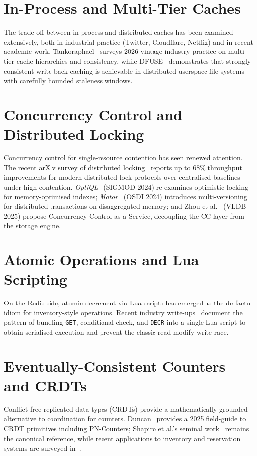 \documentclass[12pt,a4paper,oneside]{report}
\begin{document}
\section[Multi-Tier Caches]{In-Process and Multi-Tier Caches}
The trade-off between in-process and distributed caches has been examined extensively, both in industrial practice (Twitter, Cloudflare, Netflix) and in recent academic work. Tankoraphael~\cite{tankoraphael2026architecture} surveys 2026-vintage industry practice on multi-tier cache hierarchies and consistency, while DFUSE~\cite{wong2024dfuse} demonstrates that strongly-consistent write-back caching is achievable in distributed userspace file systems with carefully bounded staleness windows.

\section[Concurrency Control]{Concurrency Control and Distributed Locking}
Concurrency control for single-resource contention has seen renewed attention. The recent arXiv survey of distributed locking~\cite{anonymous2025distlock} reports up to 68\% throughput improvements for modern distributed lock protocols over centralised baselines under high contention. \emph{OptiQL}~\cite{wang2024optiql} (SIGMOD 2024) re-examines optimistic locking for memory-optimised indexes; \emph{Motor}~\cite{wei2024motor} (OSDI 2024) introduces multi-versioning for distributed transactions on disaggregated memory; and Zhou et al.~\cite{zhou2025ccaas} (VLDB 2025) propose Concurrency-Control-as-a-Service, decoupling the CC layer from the storage engine.

\section[Atomic Operations]{Atomic Operations and Lua Scripting}
On the Redis side, atomic decrement via Lua scripts has emerged as the de facto idiom for inventory-style operations. Recent industry write-ups~\cite{oneuptime2026lua, oneuptime2026inventory, dev2025redislua} document the pattern of bundling \texttt{GET}, conditional check, and \texttt{DECR} into a single Lua script to obtain serialised execution and prevent the classic read-modify-write race.

\section[CRDT Counters]{Eventually-Consistent Counters and CRDTs}
Conflict-free replicated data types (CRDTs) provide a mathematically-grounded alternative to coordination for counters. Duncan~\cite{duncan2025crdt} provides a 2025 field-guide to CRDT primitives including PN-Counters; Shapiro et al.'s seminal work~\cite{shapiro2011crdt} remains the canonical reference, while recent applications to inventory and reservation systems are surveyed in~\cite{ably2024crdt, ijsoc2025inventory}.
\end{document}
